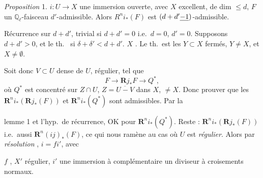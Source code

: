 \documentclass[11pt,a4paper]{article}
\begin{document}
\emph{Proposition} 1.  $i\colon U \to X$ une immersion ouverte, avec $X$ excellent, de dim $\leq d$, $F$ un $\mathbb{Q}_{\ell}$-faisceau \struck{\ill{}} $d'$-admissible. Alors $R^{n}i_{*}(F)$ est $(d+d'\uncertain{-1})$-admissible.



Récurrence sur $d+d'$, trivial si $d+d' = 0$ i.e.\ $d = 0$, $d' = 0$. Supposons $d+d' > 0$, et le th.\  si $\delta + \delta' < d+d'$. \ill{}   $X$ \ill{} \ill{} \ill{}. \struck{\ill{}} Le th.\ est \ill{}     les $Y \subset X$ fermés, $Y \neq X$, et $X \neq \emptyset$.

Soit donc $V \subset U$ \ill{} dense de $U$, régulier, tel que
\[
F \to \mathbf{R}j_{*}F \to Q^{*},
\]
où $Q^{*}$ est concentré sur $Z \cap U$, $Z = \overline{U - V}$  dans $X$, \ill{} $\neq X$. Donc \ill{} \ill{} \ill{} \ill{} prouver que les $\mathbf{R}^{n}i_{*}(\mathbf{R}j_{*}(F))$ et $\mathbf{R}^{n}i_{*}(Q^{*})$ sont admissibles. Par la

lemme 1 et l'hyp.\ de récurrence,  OK pour $\mathbf{R}^{n}i_{*}(Q^{*})$. Reste : $\mathbf{R}^{n}i_{*}(\mathbf{R}j_{*}(F))$ i.e.\ aussi $\mathbf{R}^{n}(ij)_{*}(F)$, ce qui nous ramène au cas où $U$ est \emph{régulier}. Alors par \emph{résolution} \ill{}, $i = fi'$, avec


$f$ , $X'$ régulier, $i'$ une immersion \ill{} à complémentaire un diviseur à croisements normaux.
\end{document}
